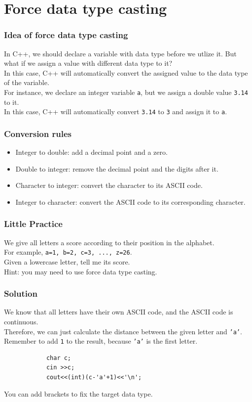 \documentclass[xcolor=dvipsnames]{beamer}
\begin{document}
    \section{Force data type casting}
    \begin{frame}
        \frametitle{Idea of force data type casting}
        In C++, we should declare a variable with data type before we utlize it. But what if we assign a value with different data type to it?\\
        In this case, C++ will automatically convert the assigned value to the data type of the variable.\\
        For instance, we declare an integer variable \texttt{a}, but we assign a double value \texttt{3.14} to it.\\
        In this case, C++ will automatically convert \texttt{3.14} to \texttt{3} and assign it to \texttt{a}.\\
    \end{frame}
    \begin{frame}
        \frametitle{Conversion rules}
        \begin{itemize}
            \item Integer to double: add a decimal point and a zero.\\
            \item Double to integer: remove the decimal point and the digits after it.\\
            \item Character to integer: convert the character to its ASCII code.\\
            \item Integer to character: convert the ASCII code to its corresponding character.
        \end{itemize}
    \end{frame}
    \begin{frame}
        \frametitle{Little Practice}
        We give all letters a score according to their position in the alphabet.\\
        For example, \texttt{a=1, b=2, c=3, ..., z=26}.\\
        Given a lowercase letter, tell me its score.\\
        Hint: you may need to use force data type casting.
    \end{frame}
    \begin{frame}[fragile]
        \frametitle{Solution}
        We know that all letters have their own ASCII code, and the ASCII code is continuous.\\
        Therefore, we can just calculate the distance between the given letter and \texttt{'a'}.\\
        Remember to add \texttt{1} to the result, because \texttt{'a'} is the first letter.\\
        \begin{verbatim}
            char c;
            cin >>c;
            cout<<(int)(c-'a'+1)<<'\n';
        \end{verbatim}
        You can add brackets to fix the target data type.
    \end{frame}
\end{document}
